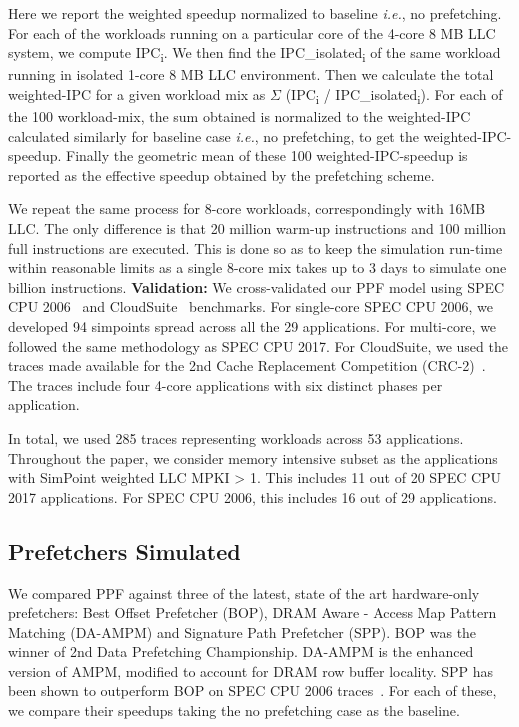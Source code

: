 Here we report the weighted speedup normalized to baseline
\textit{i.e.}, no prefetching. For each of the workloads running on a
particular core of the 4-core 8 MB LLC system, we compute
IPC\textsubscript{i}. We then find the IPC\_isolated\textsubscript{i}
of the same workload running in isolated 1-core 8 MB LLC environment.
Then we calculate the total weighted-IPC for a given workload mix as
$\Sigma$ (IPC\textsubscript{i} / IPC\_isolated\textsubscript{i}). For
each of the 100 workload-mix, the sum obtained is normalized to the
weighted-IPC calculated similarly for baseline case \textit{i.e.}, no
prefetching, to get the weighted-IPC-speedup. Finally the geometric
mean of these 100 weighted-IPC-speedup is reported as the effective
speedup obtained by the prefetching scheme.

We repeat the same process for 8-core workloads, correspondingly with
16MB LLC. The only difference is that 20 million warm-up instructions
and 100 million full instructions are executed. This is done so as to
keep the simulation run-time within reasonable limits as a single
8-core mix takes up to 3 days to simulate one billion instructions.
\newline
\newline
\noindent \textbf{Validation:} We cross-validated our PPF model using
SPEC CPU 2006~\cite{SPEC2006} and CloudSuite~\cite{CloudSuite}
benchmarks. For single-core SPEC CPU 2006, we developed 94 simpoints
spread across all the 29 applications.  For multi-core, we followed
the same methodology as SPEC CPU 2017.  For CloudSuite, we used the
traces made available for the 2nd Cache Replacement Competition
(CRC-2)~\cite{CRC_2}. The traces include four 4-core applications with
six distinct phases per application.

In total, we used 285 traces representing workloads across 53
applications.  Throughout the paper, we consider memory intensive
subset as the applications with SimPoint weighted LLC MPKI > 1. This
includes 11 out of 20 SPEC CPU 2017 applications. For SPEC CPU 2006,
this includes 16 out of 29 applications.

\subsection{Prefetchers Simulated}
\label{Method-Prefetchers}
We compared PPF against three of the latest, state of the art
hardware-only prefetchers: Best Offset Prefetcher (BOP), DRAM Aware -
Access Map Pattern Matching (DA-AMPM) \cite{DA_AMPM} and Signature
Path Prefetcher (SPP).  BOP was the winner of 2nd Data Prefetching
Championship. DA-AMPM is the enhanced version of AMPM, modified to
account for DRAM row buffer locality. SPP has been shown to outperform
BOP on SPEC CPU 2006 traces~\cite{SPP}. For each of these, we compare
their speedups taking the no prefetching case as the baseline.

